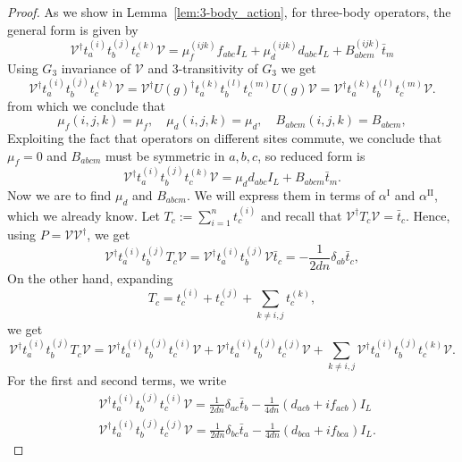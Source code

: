 \documentclass[10pt,twocolumn,superscriptaddress,aps,amsmath,amssymb,citeautoscript,floatfix,prx]{revtex4-2}
\theoremstyle{plain}
\theoremstyle{plain}
\theoremstyle{plain}
\theoremstyle{plain}
\theoremstyle{plain}
\theoremstyle{plain}
\theoremstyle{plain}
\theoremstyle{definition}
\theoremstyle{plain}
\begin{document}
\begin{appendix}
\begin{proof}
    As we show in Lemma~\ref{lem:3-body_action}, for three-body operators, the general form is given by
    \[
        \mathcal{V}^{\dagger} t_a^{(i)} t_b^{(j)} t_c^{(k)} \mathcal{V}=\mu_f^{(i j k)} f_{a b c} I_L+\mu_d^{(i j k)} d_{a b c} I_L+B_{a b c m}^{(i j k)} \bar{t}_m
    \]
    Using $G_3$ invariance of $\mathcal{V}$ and $3$-transitivity of $G_3$ we get
    \[
        \mathcal{V}^{\dagger} t_a^{(i)} t_b^{(j)} t_c^{(k)}  \mathcal{V}=\mathcal{V}^{\dagger} U(g)^{\dagger} t_a^{(k)} t_b^{(l)} t_c^{(m)} U(g) \mathcal{V}
        =\mathcal{V}^{\dagger} t_a^{(k)} t_b^{(l)} t_c^{(m)} \mathcal{V} .
    \]
    from which we conclude that
    \[
        \mu_f(i, j, k)=\mu_f, \quad \mu_d(i, j, k)=\mu_d, \quad B_{a b c m}(i, j, k)=B_{a b c m},
    \]
    Exploiting the fact that operators on different sites commute, we conclude that $\mu_f=0$ and $B_{a b c m}$ must be symmetric in $a, b, c$,
    so reduced form is
    \[
    \mathcal{V}^{\dagger} t_a^{(i)} t_b^{(j)} t_c^{(k)} \mathcal{V}=\mu_d d_{a b c} I_L+B_{a b c m}\bar{t}_m.
    \]
    Now we are to find $\mu_d$ and $B_{a b c m}$. We will express them in terms of $\alpha^{\text{I}}$ and $\alpha^{\text{II}}$, which we already know. 
    Let
    $
        T_c:=\sum_{i=1}^n t_c^{(i)}
    $
    and recall that $\mathcal{V}^{\dagger} T_c \mathcal{V}=\bar{t}_c$. Hence, using $P=\mathcal{V}\mathcal{V}^{\dagger}$, we get
    \begin{equation}\label{eq:Vta_tbT_cVR}
        \mathcal{V}^{\dagger} t_a^{(i)} t_b^{(j)} T_c \mathcal{V}=\mathcal{V}^{\dagger} t_a^{(i)} t_b^{(j)} \mathcal{V} \bar{t}_c =-\frac{1}{2 d n} \delta_{a b} \bar{t}_c,
    \end{equation}
    On the other hand, expanding
    \[
        T_c=t_c^{(i)}+t_c^{(j)}+\sum_{k \neq i, j} t_c^{(k)},
    \]
    we get
    \begin{equation}\label{eq:Vta_tbT_cVL}
        \mathcal{V}^{\dagger} t_a^{(i)} t_b^{(j)} T_c \mathcal{V}=\mathcal{V}^{\dagger} t_a^{(i)} t_b^{(j)} t_c^{(i)} \mathcal{V}+\mathcal{V}^{\dagger} t_a^{(i)} t_b^{(j)} t_c^{(j)} \mathcal{V}+
        \sum_{k \neq i, j} \mathcal{V}^{\dagger} t_a^{(i)} t_b^{(j)} t_c^{(k)} \mathcal{V} .
    \end{equation}
    For the first and second terms, we write
    \[
        \begin{aligned}
        &\mathcal{V}^{\dagger} t_a^{(i)} t_b^{(j)} t_c^{(i)} \mathcal{V}=\frac{1}{2 d n} \delta_{a c} \bar{t}_b-\frac{1}{4 d n}\left(d_{a c b}+i f_{a c b}\right) I_L\\
        &\mathcal{V}^{\dagger} t_a^{(i)} t_b^{(j)} t_c^{(j)} \mathcal{V}=\frac{1}{2 d n} \delta_{b c} \bar{t}_a-\frac{1}{4 d n}\left(d_{b c a}+i f_{b c a}\right) I_L .

\end{aligned}\]
\end{proof}
\end{appendix}
\end{document}
